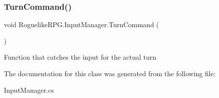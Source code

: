 \subsubsection{\texorpdfstring{Turn\+Command()}{TurnCommand()}}
{\footnotesize\ttfamily void Roguelike\+R\+P\+G.\+Input\+Manager.\+Turn\+Command (\begin{DoxyParamCaption}{ }\end{DoxyParamCaption})\hspace{0.3cm}{\ttfamily [inline]}}



Function that catches the input for the actual turn 



The documentation for this class was generated from the following file\+:\begin{DoxyCompactItemize}
\item 
Input\+Manager.\+cs\end{DoxyCompactItemize}
